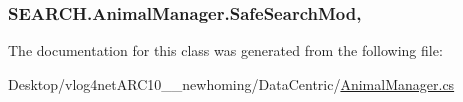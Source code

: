 \hypertarget{class_s_e_a_r_c_h_1_1_animal_manager_a1343854b00d8b64b3ab607f8aaf75795}{
\subsubsection[{Safe\-Search\-Mod}]{ S\-E\-A\-R\-C\-H.\-Animal\-Manager.\-Safe\-Search\-Mod\hspace{0.3cm}{\ttfamily [get]}, {\ttfamily [set]}}}\label{class_s_e_a_r_c_h_1_1_animal_manager_a1343854b00d8b64b3ab607f8aaf75795}


The documentation for this class was generated from the following file\-:\begin{DoxyCompactItemize}
\item 
Desktop/vlog4net\-A\-R\-C10\-\_\-\_\-newhoming/\-Data\-Centric/\hyperlink{_animal_manager_8cs}{Animal\-Manager.\-cs}\end{DoxyCompactItemize}
